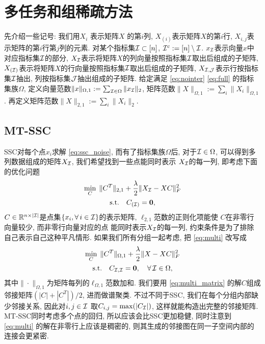 \section{多任务和组稀疏方法}
先介绍一些记号: 我们用\(X_i\) 表示矩阵\(X\) 的第\(i\)列,
\(X_{(i)}\)表示矩阵\(X\)的第\(i\)行,
\(X_{i,j}\)表示矩阵的第\(i\)行第\(j\)列的元素.
对某个指标集\(\mathcal{I}\subset [n]\), \(\mathcal{I}^c:=[n]\setminus \mathcal{I}\).
\(x_{\mathcal{I}}\)表示向量\(x\)中对应指标集\(\mathcal{I}\)的部分,
\(X_{\mathcal{I}}\)表示将矩阵\(X\)的列向量按照指标集\(\mathcal{I}\)取出后组成的子矩阵, 
\(X_{(\mathcal{I})}\)表示将矩阵\(X\)的行向量按照指标集\(\mathcal{I}\)取出后组成的子矩阵,
\(X_{\mathcal{I}, \mathcal{J}}\)表示行按指标集\(\mathcal{I}\)抽出, 列按指标集\(\mathcal{J}\)抽出组成的子矩阵. 
给定满足 \eqref{eq:nointer}  \eqref{eq:full} 的指标集族\(\Omega\),
定义向量范数\(\|x\|_{\Omega, 1}:=\sum_{\mathcal{I} \in \Omega} \|x_{\mathcal{I}}\|_2\),
矩阵范数\(\|X\|_{\Omega, 1}:=\sum_{i} \|X_i\|_{\Omega, 1}\).
再定义矩阵范数\(\|X\|_{2, 1}:=\sum_{i} \|X_i\|_2\).

\subsection{MT-SSC}
SSC对每个点\(x_i\)求解 \eqref{eq:ssc_noise},  
而有了指标集族\(\Omega\)后, 对于\(\mathcal{I}\in \Omega\),
可以得到多列数据组成的矩阵\(X_{\mathcal{I}}\), 我们希望找到一些点能同时表示
\(X_{\mathcal{I}}\)的每一列, 即考虑下面的优化问题
\begin{equation}\label{eq:multi}
  \begin{gathered}
    \min_{C}\; \|C^T\|_{2, 1} + \frac{\lambda}{2} \|X_{\mathcal{I}} - XC\|_F^2\\
    \text{s.t.} \quad C_{(\mathcal{I})} = \mathbf{0},
  \end{gathered}
\end{equation}
\(C \in \mathbb{R}^{n \times |\mathcal{I}|}\)是点集\(\{x_i, \forall\, i\in \mathcal{I}\}\)的表示矩阵,
\(\ell_{2,1}\)范数的正则化项能使 \(C\)在非零行向量较少, 而非零行向量对应的点
能同时表示\(X_{\mathcal{I}}\)的每一列, 约束条件是为了排除自己表示自己这种平凡情形.
如果我们所有分组一起考虑, 把 \eqref{eq:multi} 改写成
\begin{equation}\label{eq:multi_matrix}
  \begin{gathered}
    \min_C\; \|C^T\|_{\Omega, 1} + \frac{\lambda}{2} \|X-XC\|_F^2 \\
    \text{s.t.} \quad C_{\mathcal{I}, \mathcal{I}} = \mathbf{0}, \quad \forall \, \mathcal{I} \in
    \Omega,
  \end{gathered}
\end{equation}
其中\(\|\cdot\|_{\Omega, 1}\)为矩阵每列的\(\ell_{\Omega, 1}\)范数加和.
我们要用 \eqref{eq:multi_matrix} 的解\(C\)组成邻接矩阵\((|C|+|C^T|)/2\),
进而做谱聚类. 不过不同于SSC, 我们在每个分组内部缺少邻接关系,
因此对\(i, j\in\mathcal{I}\) 取\(C_{i, j} = \max(|C_{\mathcal{I}}|)\), 这样就能构造出完整的邻接矩阵.
MT-SSC同时考虑多个点的回归, 所以应该会比SSC更加稳健, 同时注意到 \eqref{eq:multi} 
的解在非零行上应该是稠密的, 则其生成的邻接图在同一子空间内部的连接会更紧密.


